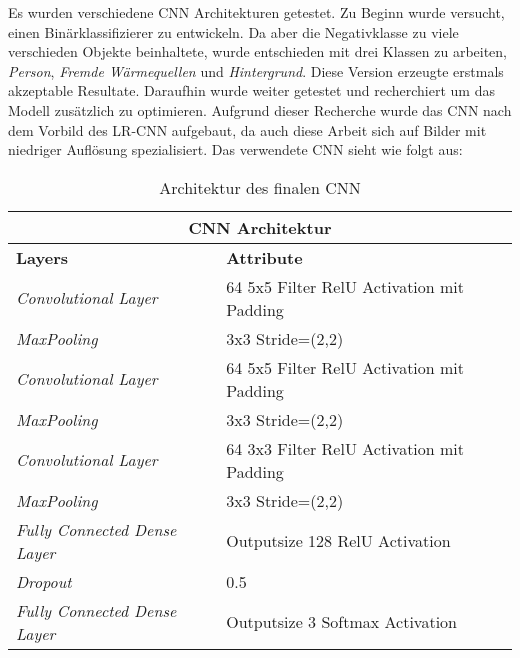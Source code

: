Es wurden verschiedene \gls{CNN} Architekturen getestet. Zu Beginn wurde versucht, einen Binärklassifizierer zu entwickeln. Da aber die Negativklasse zu viele verschieden Objekte beinhaltete, wurde entschieden mit drei Klassen zu arbeiten, \textit{Person}, \textit{Fremde Wärmequellen} und \textit{Hintergrund}. Diese Version erzeugte erstmals akzeptable Resultate. Daraufhin wurde weiter getestet und recherchiert um das Modell zusätzlich zu optimieren. Aufgrund dieser Recherche wurde das \gls{CNN} nach dem Vorbild des LR-CNN \parencite{cnnArchitecture} aufgebaut, da auch diese Arbeit sich auf Bilder mit niedriger Auflösung spezialisiert. Das verwendete CNN sieht wie folgt aus:

{
	\renewcommand{\arraystretch}{1.3}
	
	\begin{table}[H]
		\scriptsize
		\centering
		\begin{tabularx}{.8\textwidth}{XX}\\
			\multicolumn{2}{c}{\textbf{CNN Architektur}}\\
			\hline
			\textbf{Layers} & \textbf{Attribute}\\
			\hline
			\textit{Convolutional Layer} & 64 5x5 Filter RelU Activation mit Padding\\
			\hline
			\textit{MaxPooling} & 3x3 Stride=(2,2)\\
			\hline 
			\textit{Convolutional Layer} & 64 5x5 Filter RelU Activation mit Padding\\
			\hline
			\textit{MaxPooling} & 3x3 Stride=(2,2)\\
			\hline
			\textit{Convolutional Layer} & 64 3x3 Filter RelU Activation mit Padding\\
			\hline
			\textit{MaxPooling} & 3x3 Stride=(2,2)\\
			\hline
			\textit{Fully Connected Dense Layer} & Outputsize 128 RelU Activation\\
			\hline
			\textit{Dropout} & 0.5\\
			\hline
			\textit{Fully Connected Dense Layer} & Outputsize 3 Softmax Activation\\
			\hline
		\end{tabularx}
		\caption{Architektur des finalen CNN}
		\label{tbl:cnnArchitecture}
	\end{table}
	\vspace{3em}
	\begin{table}[H]
		\scriptsize
		\centering
		\begin{tabularx}{.8\textwidth}{XX}

\end{tabularx}
\end{table}}
